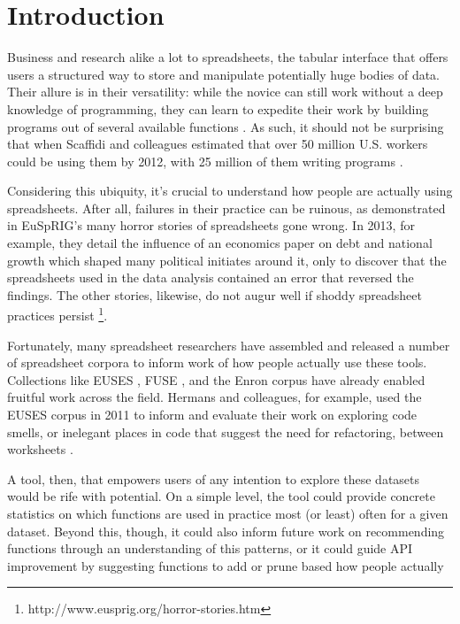 \documentclass[conference]{IEEEtran}
\begin{document}
\section{Introduction}
Business and research alike a lot to spreadsheets, the tabular interface that offers users a structured way to store
and manipulate potentially huge bodies of data. Their allure is in their versatility: while the novice can still work 
without a deep knowledge of programming, they can learn to expedite their work by building programs out of several available functions
\cite{nardi1990spreadsheet}. As such, it should not be surprising that when Scaffidi and colleagues estimated that 
over 50 million U.S. workers could be using them by 2012, with 25 million of them writing programs  \cite{scaffidi2005estimating}. \par
Considering this ubiquity, it's crucial to understand how people are actually using spreadsheets. After all, failures
in their practice can be ruinous, as demonstrated in EuSpRIG's many horror stories of spreadsheets gone wrong. In 
2013, for example, they detail the influence of an economics paper on debt and national growth which shaped many 
political initiates around it, only to discover that the spreadsheets used in the data analysis contained an error that
reversed the findings. The other stories, likewise, do not augur well if shoddy spreadsheet practices persist
\footnote{http://www.eusprig.org/horror-stories.htm}. \par 
Fortunately, many spreadsheet researchers have assembled and released a number of spreadsheet corpora to inform work
of how people actually use these tools. Collections like EUSES \cite{fisher2005euses}, FUSE \cite{barik2015fuse}, and
the Enron corpus \cite{hermans2015enron} have already enabled fruitful work across the field. Hermans and colleagues,
for example, used the EUSES corpus in 2011 to inform and evaluate their work on exploring code smells, or inelegant
places in code that suggest the need for refactoring, between worksheets \cite{hermans2012detecting}. \par 
A tool, then, that empowers users of any intention to explore these datasets would be rife with potential. On a simple
level, the tool could provide concrete statistics on which functions are used in practice most (or least) often for a
given dataset. Beyond this, though, it could also inform future work on recommending functions through an understanding
of this patterns, or it could guide API improvement by suggesting functions to add or prune based how people actually
\end{document}
